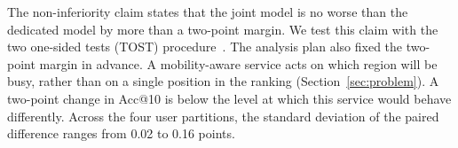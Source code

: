 The non-inferiority claim states that the joint model is no worse than the dedicated model by more than a two-point margin. We test this claim with the two one-sided tests (TOST) procedure~\cite{lakens2017tost}. The analysis plan also fixed the two-point margin in advance. A mobility-aware service acts on which region will be busy, rather than on a single position in the ranking (Section~\ref{sec:problem}). A two-point change in Acc@10 is below the level at which this service would behave differently. Across the four user partitions, the standard deviation of the paired difference ranges from 0.02 to 0.16 points.
